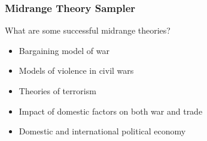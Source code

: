 \documentclass[handout]{beamer}
\begin{document}
\begin{frame} 
	\frametitle{\LARGE{Midrange Theory Sampler}}
	What are some successful midrange theories?
	\begin{itemize}
		\item Bargaining model of war \pause
		\item Models of violence in civil wars \pause
		\item Theories of terrorism \pause
		\item Impact of domestic factors on both war and trade \pause
		\item Domestic and international political economy		
	\end{itemize}
\end{frame}
\end{document}
